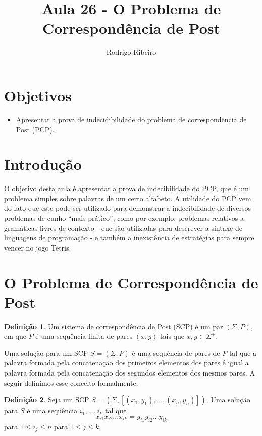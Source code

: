 \documentclass[a4paper]{article}
\theoremstyle{definition}
\newtheorem{Definition}{Definição}
\begin{document}
\title{Aula 26 - O Problema de Correspondência de Post}
  \author{Rodrigo Ribeiro}

  \maketitle

  \pagestyle{fancy}


  \section*{Objetivos}

  \begin{itemize}
    \item Apresentar a prova de indecidibilidade do problema de correspondência
      de Post (PCP).
  \end{itemize}


  \section{Introdução}

  O objetivo desta aula é apresentar a prova de indecibilidade do PCP, que é um
  problema simples sobre palavras de um certo alfabeto. A utilidade do PCP vem
  do fato que este pode ser utilizado para demonstrar a indecibilidade de
  diversos problemas de cunho ``mais prático'', como por exemplo, problemas
  relativos a gramáticas livres de contexto - que são utilizadas para descrever
  a sintaxe de linguagens de programação - e também a inexistência de
  estratégias para sempre vencer no jogo Tetris.


  \section{O Problema de Correspondência de Post}

  \begin{Definition}
    Um sistema de correspondência de Post (SCP) é um par $(\Sigma,P)$, em que
    $P$ é uma sequência finita de pares $(x,y)$ tais que $x,y\in \Sigma^+$.
  \end{Definition}

  Uma solução para um SCP $S = (\Sigma,P)$ é uma sequência de pares de $P$ tal
  que a palavra formada pela concatenação dos primeiros elementos dos pares
  é igual a palavra formada pela concatenação dos segundos elementos dos
  mesmos pares. A seguir definimos esse conceito formalmente.

  \begin{Definition}
    Seja um SCP $S = (\Sigma, [(x_1,y_1),...,(x_n,y_n)])$. Uma solução para $S$
    é uma sequência $i_1,...,i_k$ tal que
    \[
      x_{i1}x_{i2}...x_{ik} = y_{i1}y_{i2}...y_{ik}
    \]
    para $1 \leq i_j \leq n$ para $1 \leq j \leq k$.
  \end{Definition}
\end{document}

